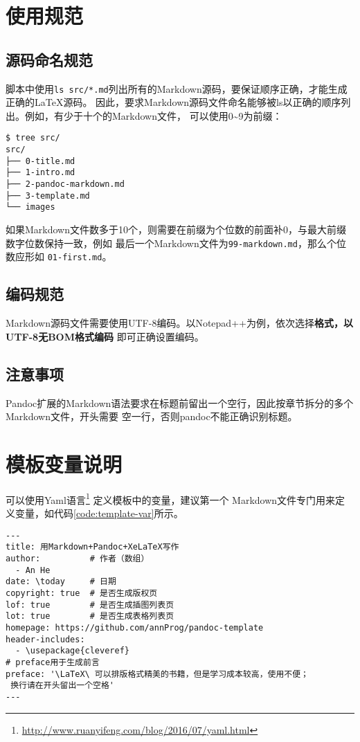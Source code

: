 \documentclass[fancyhdr,bookmark]{ctexbook}
\renewcommand{\href}[2]{#2\footnote{\url{#1}}}
\begin{document}
\section{使用规范}\label{ux4f7fux7528ux89c4ux8303}

\subsection{源码命名规范}\label{ux6e90ux7801ux547dux540dux89c4ux8303}

脚本中使用\lstinline!ls src/*.md!列出所有的Markdown源码，要保证顺序正确，才能生成正确的LaTeX源码。
因此，要求Markdown源码文件命名能够被ls以正确的顺序列出。例如，有少于十个的Markdown文件，
可以使用0\textasciitilde{}9为前缀：

\begin{lstlisting}
$ tree src/
src/
├── 0-title.md
├── 1-intro.md
├── 2-pandoc-markdown.md
├── 3-template.md
└── images
\end{lstlisting}

如果Markdown文件数多于10个，则需要在前缀为个位数的前面补0，与最大前缀数字位数保持一致，例如
最后一个Markdown文件为\lstinline!99-markdown.md!，那么个位数应形如
\lstinline!01-first.md!。

\subsection{编码规范}\label{ux7f16ux7801ux89c4ux8303}

Markdown源码文件需要使用UTF-8编码。以Notepad++为例，依次选择\textbf{格式，以UTF-8无BOM格式编码}
即可正确设置编码。

\subsection{注意事项}\label{title:note}

Pandoc扩展的Markdown语法要求在标题前留出一个空行，因此按章节拆分的多个Markdown文件，开头需要
空一行，否则pandoc不能正确识别标题。

\section{模板变量说明}\label{ux6a21ux677fux53d8ux91cfux8bf4ux660e}

可以使用\href{http://www.ruanyifeng.com/blog/2016/07/yaml.html}{Yaml语言}
定义模板中的变量，建议第一个
Markdown文件专门用来定义变量，如代码\ref{code:template-var}所示。

\begin{lstlisting}[label=code:template-var, caption=code:template-var, float=htbp]
---
title: 用Markdown+Pandoc+XeLaTeX写作
author:          # 作者（数组）
  - An He
date: \today     # 日期
copyright: true  # 是否生成版权页
lof: true        # 是否生成插图列表页
lot: true        # 是否生成表格列表页
homepage: https://github.com/annProg/pandoc-template
header-includes:
  - \usepackage{cleveref}
# preface用于生成前言
preface: '\LaTeX\ 可以排版格式精美的书籍，但是学习成本较高，使用不便；
 换行请在开头留出一个空格'
---
\end{lstlisting}
\end{document}
